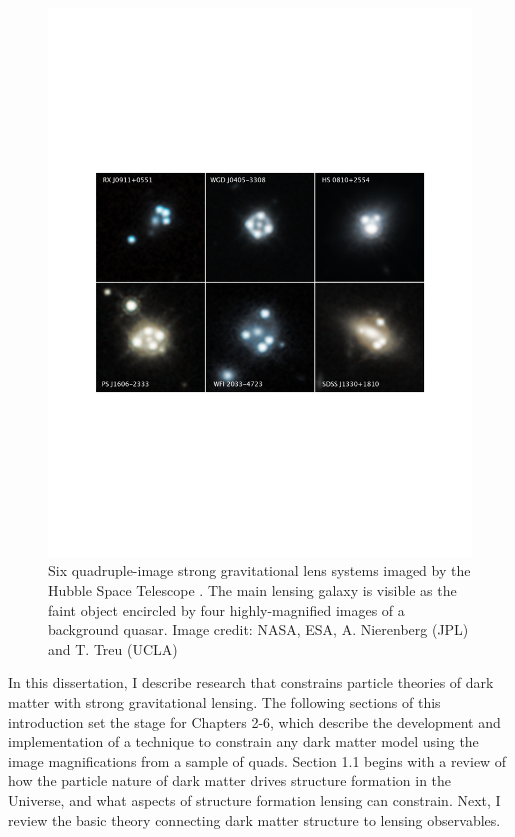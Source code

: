 \begin{figure}
	\centering
	\includegraphics[clip,trim=2.5cm 8cm 2.5cm
	8.5cm,width=.95\textwidth,keepaspectratio]{./figures_introduction/lenses.pdf}
	\caption[Six images of strong gravitational lenses]{\label{fig:lens2033} Six quadruple-image strong gravitational lens systems imaged by the Hubble Space Telescope \citep{Nierenberg++19}. The main lensing galaxy is visible as the faint object encircled by four highly-magnified images of a background quasar. Image credit: NASA, ESA, A. Nierenberg (JPL) and T. Treu (UCLA)}
\end{figure}	
In this dissertation, I describe research that constrains particle theories of dark matter with strong gravitational lensing. The following sections of this introduction set the stage for Chapters 2-6, which describe the development and implementation of a technique to constrain any dark matter model using the image magnifications from a sample of quads. Section 1.1 begins with a review of how the particle nature of dark matter drives structure formation in the Universe, and what aspects of structure formation lensing can constrain. Next, I review the basic theory connecting dark matter structure to lensing observables. 

